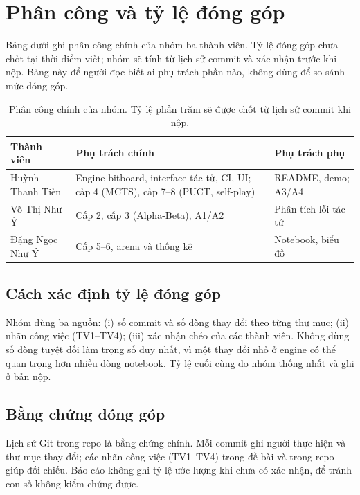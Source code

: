 \chapter{Phân công và tỷ lệ đóng góp}
\label{app:phan-cong}

Bảng dưới ghi phân công chính của nhóm ba thành viên. Tỷ lệ đóng góp chưa chốt tại thời điểm
viết; nhóm sẽ tính từ lịch sử commit và xác nhận trước khi nộp. Bảng này để người đọc biết ai
phụ trách phần nào, không dùng để so sánh mức đóng góp.

\begin{table}[H]
  \centering\small
  \begin{tabularx}{\textwidth}{@{}>{\raggedright\arraybackslash}p{} >{\raggedright\arraybackslash}X >{\raggedright\arraybackslash}X@{}}
    \toprule
    \textbf{Thành viên} & \textbf{Phụ trách chính} & \textbf{Phụ trách phụ} \\
    \midrule
    Huỳnh Thanh Tiến & Engine bitboard, interface tác tử, CI, UI; cấp 4 (MCTS), cấp 7--8 (PUCT, self-play) & README, demo; A3/A4 \\
    Võ Thị Như Ý & Cấp 2, cấp 3 (Alpha-Beta), A1/A2 & Phân tích lỗi tác tử \\
    Đặng Ngọc Như Ý & Cấp 5--6, arena và thống kê & Notebook, biểu đồ \\
    \bottomrule
  \end{tabularx}
  \caption{Phân công chính của nhóm. Tỷ lệ phần trăm sẽ được chốt từ lịch sử commit khi nộp.}
  \label{tab:phan-cong}
\end{table}

\section{Cách xác định tỷ lệ đóng góp}
Nhóm dùng ba nguồn: (i) số commit và số dòng thay đổi theo từng thư mục; (ii) nhãn công việc
(TV1--TV4); (iii) xác nhận chéo của các thành viên. Không dùng số dòng tuyệt đối làm
trọng số duy nhất, vì một thay đổi nhỏ ở engine có thể quan trọng hơn nhiều dòng notebook. Tỷ
lệ cuối cùng do nhóm thống nhất và ghi ở bản nộp.

\section{Bằng chứng đóng góp}
Lịch sử Git trong repo là bằng chứng chính. Mỗi commit ghi người thực hiện và thư mục thay đổi;
các nhãn công việc (TV1--TV4) trong đề bài và trong repo giúp đối chiếu. Báo cáo không ghi tỷ lệ
ước lượng khi chưa có xác nhận, để tránh con số không kiểm chứng được.